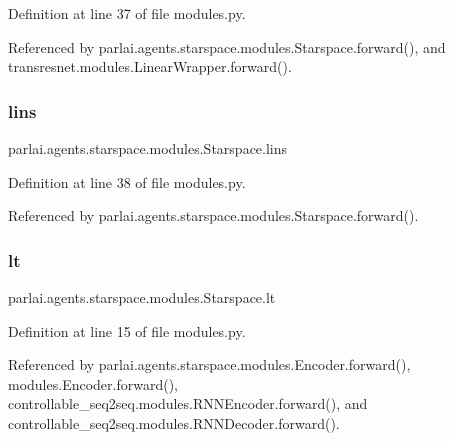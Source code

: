 Definition at line 37 of file modules.\+py.



Referenced by parlai.\+agents.\+starspace.\+modules.\+Starspace.\+forward(), and transresnet.\+modules.\+Linear\+Wrapper.\+forward().

\mbox{\label{classparlai_1_1agents_1_1starspace_1_1modules_1_1Starspace_a277328d66e566f3f9874e7af4402cef9}} 
\subsubsection{\texorpdfstring{lins}{lins}}
{\footnotesize\ttfamily parlai.\+agents.\+starspace.\+modules.\+Starspace.\+lins}



Definition at line 38 of file modules.\+py.



Referenced by parlai.\+agents.\+starspace.\+modules.\+Starspace.\+forward().

\mbox{\label{classparlai_1_1agents_1_1starspace_1_1modules_1_1Starspace_abec90fc1b96357cb230a2b3118c9275f}} 
\subsubsection{\texorpdfstring{lt}{lt}}
{\footnotesize\ttfamily parlai.\+agents.\+starspace.\+modules.\+Starspace.\+lt}



Definition at line 15 of file modules.\+py.



Referenced by parlai.\+agents.\+starspace.\+modules.\+Encoder.\+forward(), modules.\+Encoder.\+forward(), controllable\+\_\+seq2seq.\+modules.\+R\+N\+N\+Encoder.\+forward(), and controllable\+\_\+seq2seq.\+modules.\+R\+N\+N\+Decoder.\+forward().

